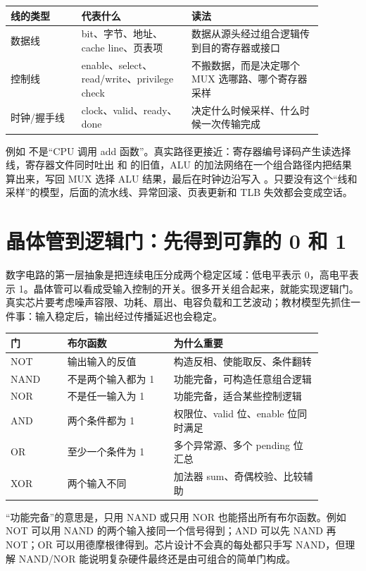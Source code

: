 \begin{longtable}{p{0.20\linewidth}p{0.31\linewidth}p{0.37\linewidth}}
\toprule
线的类型 & 代表什么 & 读法 \\
\midrule
数据线 & bit、字节、地址、cache line、页表项 & 数据从源头经过组合逻辑传到目的寄存器或接口 \\
控制线 & enable、select、read/write、privilege check & 不搬数据，而是决定哪个 MUX 选哪路、哪个寄存器采样 \\
时钟/握手线 & clock、valid、ready、done & 决定什么时候采样、什么时候一次传输完成 \\
\bottomrule
\end{longtable}

例如  不是“CPU 调用 add 函数”。真实路径更接近：寄存器编号译码产生读选择线，寄存器文件同时吐出  和  的旧值，ALU 的加法网络在一个组合路径内把结果算出来，写回 MUX 选择 ALU 结果，最后在时钟边沿写入 。只要没有这个“线和采样”的模型，后面的流水线、异常回滚、页表更新和 TLB 失效都会变成空话。

\section{晶体管到逻辑门：先得到可靠的 0 和 1}

数字电路的第一层抽象是把连续电压分成两个稳定区域：低电平表示 0，高电平表示 1。晶体管可以看成受输入控制的开关。很多开关组合起来，就能实现逻辑门。真实芯片要考虑噪声容限、功耗、扇出、电容负载和工艺波动；教材模型先抓住一件事：输入稳定后，输出经过传播延迟也会稳定。

\begin{longtable}{p{0.16\linewidth}p{0.30\linewidth}p{0.42\linewidth}}
\toprule
门 & 布尔函数 & 为什么重要 \\
\midrule
NOT & 输出输入的反值 & 构造反相、使能取反、条件翻转 \\
NAND & 不是两个输入都为 1 & 功能完备，可构造任意组合逻辑 \\
NOR & 不是任一输入为 1 & 功能完备，适合某些控制逻辑 \\
AND & 两个条件都为 1 & 权限位、valid 位、enable 位同时满足 \\
OR & 至少一个条件为 1 & 多个异常源、多个 pending 位汇总 \\
XOR & 两个输入不同 & 加法器 sum、奇偶校验、比较辅助 \\
\bottomrule
\end{longtable}

“功能完备”的意思是，只用 NAND 或只用 NOR 也能搭出所有布尔函数。例如 NOT 可以用 NAND 的两个输入接同一个信号得到；AND 可以先 NAND 再 NOT；OR 可以用德摩根律得到。芯片设计不会真的每处都只手写 NAND，但理解 NAND/NOR 能说明复杂硬件最终还是由可组合的简单门构成。

